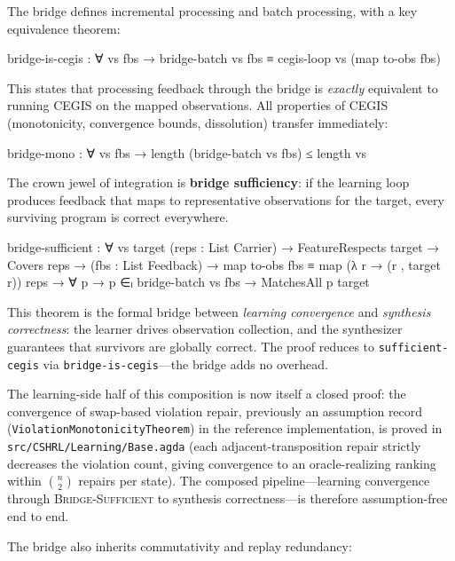 \documentclass[9pt,a4paper]{article}
\newcommand{\fpath}[1]{\nolinkurl{#1}}
\theoremstyle{plain}
\theoremstyle{definition}
\theoremstyle{remark}
\begin{document}
The bridge defines incremental processing and batch processing, with a key equivalence theorem:

\begin{spec}
      bridge-is-cegis : ∀ vs fbs →
        bridge-batch vs fbs ≡ cegis-loop vs (map to-obs fbs)
\end{spec}

\noindent This states that processing feedback through the bridge is \emph{exactly} equivalent to running CEGIS on the mapped observations.  All properties of CEGIS (monotonicity, convergence bounds, dissolution) transfer immediately:

\begin{spec}
      bridge-mono : ∀ vs fbs →
        length (bridge-batch vs fbs) ≤ length vs
\end{spec}

The crown jewel of integration is \textbf{bridge sufficiency}: if the learning loop produces feedback that maps to representative observations for the target, every surviving program is correct everywhere.

\begin{spec}
      bridge-sufficient : ∀ vs target (reps : List Carrier) →
        FeatureRespects target →
        Covers reps →
        (fbs : List Feedback) →
        map to-obs fbs ≡ map (λ r → (r , target r)) reps →
        ∀ p → p ∈ₗ bridge-batch vs fbs →
        MatchesAll p target
\end{spec}

\noindent This theorem is the formal bridge between \emph{learning convergence} and \emph{synthesis correctness}: the learner drives observation collection, and the synthesizer guarantees that survivors are globally correct.
The proof reduces to \texttt{sufficient-cegis} via \texttt{bridge-is-cegis}---the bridge adds no overhead.

The learning-side half of this composition is now itself a closed proof: the convergence of swap-based violation repair, previously an assumption record (\texttt{ViolationMonotonicityTheorem}) in the reference implementation, is proved in \fpath{src/CSHRL/Learning/Base.agda} (each adjacent-transposition repair strictly decreases the violation count, giving convergence to an oracle-realizing ranking within $\binom{n}{2}$ repairs per state).  The composed pipeline---learning convergence through \textsc{Bridge-Sufficient} to synthesis correctness---is therefore assumption-free end to end.

The bridge also inherits commutativity and replay redundancy:
\end{document}
